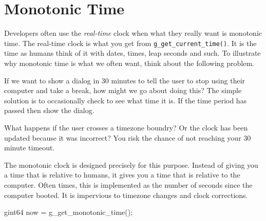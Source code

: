 \section{Monotonic Time}

Developers often use the \emph{real-time} clock when what they really want is monotonic time.
The real-time clock is what you get from \verb|g_get_current_time()|.
It is the time as humans think of it with dates, times, leap seconds and such.
To illustrate why monotonic time is what we often want, think about the following problem.

If we want to show a dialog in 30 minutes to tell the user to stop using their computer and take a break, how might we go about doing this?
The simple solution is to occasionally check to see what time it is.
If the time period has passed then show the dialog.

What happens if the user crosses a timezone boundry?
Or the clock has been updated because it was incorrect?
You risk the chance of not reaching your 30 minute timeout.


The monotonic clock is designed precisely for this purpose.
Instead of giving you a time that is relative to humans, it gives you a time that is relative to the computer.
Often times, this is implemented as the number of seconds since the computer booted.
It is impervious to timezone changes and clock corrections.

\begin{Terminal}
gint64 now = g_get_monotonic_time();
\end{Terminal}

